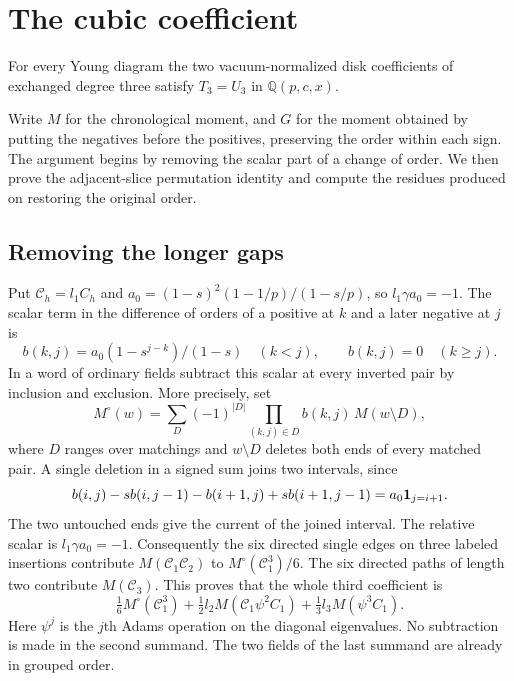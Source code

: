 \section{The cubic coefficient}\label{sec:cubic}

\begin{theorem}\label{thm:cubicdisk}
For every Young diagram the two vacuum-normalized disk coefficients of
exchanged degree three satisfy $T_3=U_3$ in $\mathbb Q(p,c,x)$.
\end{theorem}

Write $M$ for the chronological moment, and $G$ for the moment obtained by
putting the negatives before the positives, preserving the order within
each sign. The argument begins by removing the scalar part of a change of order. We then prove the adjacent-slice permutation identity and compute the residues produced on restoring the original order.

\subsection{Removing the longer gaps}
Put $\mathcal C_h=l_1 C_h$ and $a_0=(1-s)^2(1-1/p)/(1-s/p)$, so
$l_1\gamma a_0=-1$. The scalar term in the difference of orders of a
positive at $k$ and a later negative at $j$ is
\[
 b(k,j)=a_0(1-s^{j-k})/(1-s)\quad (k<j),\qquad b(k,j)=0\quad(k\ge j).
\]
In a word of ordinary fields subtract this scalar at every inverted
pair by inclusion and exclusion. More precisely, set
\[
 M^\circ(w)=\sum_D(-1)^{|D|}\prod_{(k,j)\in D}b(k,j)\,M(w\setminus D),
\]
where $D$ ranges over matchings and $w\setminus D$ deletes both ends
of every matched pair. A single deletion in a signed sum joins
two intervals, since
\[
 b(i,j)-s b(i,j-1)-b(i+1,j)+s b(i+1,j-1)=a_0{\bf1}_{j=i+1}.
\]
The two untouched ends give the current of the joined interval. The
relative scalar is $l_1\gamma a_0=-1$. Consequently the six directed
single edges on three labeled insertions contribute $M(\mathcal C_1\mathcal C_2)$ to
$M^\circ(\mathcal C_1^3)/6$. The six directed paths of length two contribute
$M(\mathcal C_3)$. This proves that the whole third coefficient is
\begin{equation}\label{eq:cubic-moment}
 \tfrac16 M^\circ(\mathcal C_1^3)+\tfrac12 l_2 M(\mathcal C_1\psi^2 C_1)
                         +\tfrac13 l_3 M(\psi^3 C_1).
\end{equation}
Here $\psi^j$ is the $j$th Adams operation on the diagonal eigenvalues.
No subtraction is made in the second summand. The two fields of the
last summand are already in grouped order.

